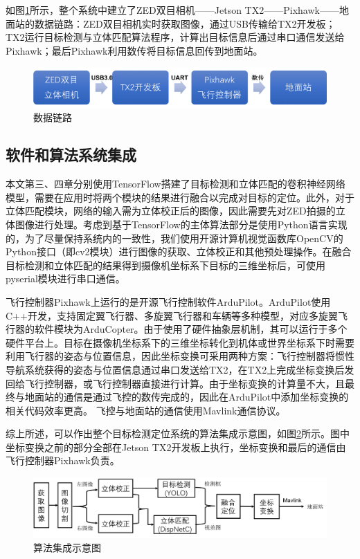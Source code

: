 如图\ref{fig:5_1_数据链路}所示，整个系统中建立了ZED双目相机——Jetson TX2——Pixhawk——地面站的数据链路：ZED双目相机实时获取图像，通过USB传输给TX2开发板；TX2运行目标检测与立体匹配算法程序，计算出目标信息后通过串口通信发送给Pixhawk；最后Pixhawk利用数传将目标信息回传到地面站。

\begin{figure}[htb] %
	\centering
	\includegraphics[width=6in]{figures/5_平台介绍/数据链路}
	\caption{数据链路}\label{fig:5_1_数据链路}
\end{figure}


\subsection{软件和算法系统集成}
本文第三、四章分别使用TensorFlow搭建了目标检测和立体匹配的卷积神经网络模型，需要在应用时将两个模块的结果进行融合以完成对目标的定位。此外，对于立体匹配模块，网络的输入需为立体校正后的图像，因此需要先对ZED拍摄的立体图像进行处理。考虑到基于TensorFlow的主体算法部分是使用Python语言实现的，为了尽量保持系统内的一致性，我们使用开源计算机视觉函数库OpenCV的Python接口（即cv2模块）进行图像的获取、立体校正和其他预处理操作。在融合目标检测和立体匹配的结果得到摄像机坐标系下目标的三维坐标后，可使用pyserial模块进行串口通信。

飞行控制器Pixhawk上运行的是开源飞行控制软件ArduPilot。ArduPilot使用C++开发，支持固定翼飞行器、多旋翼飞行器和车辆等多种模型，对应多旋翼飞行器的软件模块为ArduCopter。由于使用了硬件抽象层机制，其可以运行于多个硬件平台上。目标在摄像机坐标系下的三维坐标转化到机体或世界坐标系下时需要利用飞行器的姿态与位置信息，因此坐标变换可采用两种方案：飞行控制器将惯性导航系统获得的姿态与位置信息通过串口发送给TX2，在TX2上完成坐标变换后发回给飞行控制器，或飞行控制器直接进行计算。由于坐标变换的计算量不大，且最终与地面站的通信是通过飞控的数传完成的，因此在ArduPilot中添加坐标变换的相关代码效率更高。
飞控与地面站的通信使用Mavlink通信协议。

综上所述，可以作出整个目标检测定位系统的算法集成示意图，如图\ref{fig:5_1_算法集成示意图}所示。图中坐标变换之前的部分全部在Jetson TX2开发板上执行，坐标变换和最后的通信由飞行控制器Pixhawk负责。

\begin{figure}[htb] %
	\centering
	\includegraphics[width=6in]{figures/5_平台介绍/算法集成示意图}
	\caption{算法集成示意图}\label{fig:5_1_算法集成示意图}
\end{figure}

